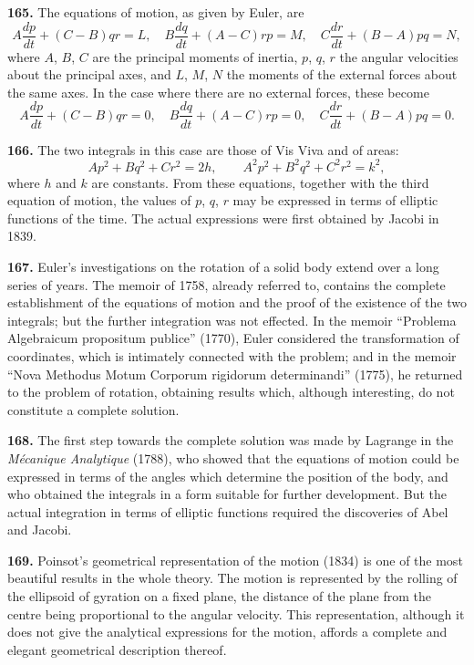 \documentclass[11pt,a4paper]{book}
\begin{document}
\textbf{165.} The equations of motion, as given by Euler, are
\[
A\frac{dp}{dt} + (C - B)qr = L, \quad B\frac{dq}{dt} + (A - C)rp = M, \quad C\frac{dr}{dt} + (B - A)pq = N,
\]
where $A$, $B$, $C$ are the principal moments of inertia, $p$, $q$, $r$ the angular velocities about the principal axes, and $L$, $M$, $N$ the moments of the external forces about the same axes. In the case where there are no external forces, these become
\[
A\frac{dp}{dt} + (C - B)qr = 0, \quad B\frac{dq}{dt} + (A - C)rp = 0, \quad C\frac{dr}{dt} + (B - A)pq = 0.
\]

\textbf{166.} The two integrals in this case are those of Vis Viva and of areas:
\[
Ap^2 + Bq^2 + Cr^2 = 2h, \qquad A^2p^2 + B^2q^2 + C^2r^2 = k^2,
\]
where $h$ and $k$ are constants. From these equations, together with the third equation of motion, the values of $p$, $q$, $r$ may be expressed in terms of elliptic functions of the time. The actual expressions were first obtained by Jacobi in 1839.

\textbf{167.} Euler's investigations on the rotation of a solid body extend over a long series of years. The memoir of 1758, already referred to, contains the complete establishment of the equations of motion and the proof of the existence of the two integrals; but the further integration was not effected. In the memoir ``Problema Algebraicum propositum publice'' (1770), Euler considered the transformation of coordinates, which is intimately connected with the problem; and in the memoir ``Nova Methodus Motum Corporum rigidorum determinandi'' (1775), he returned to the problem of rotation, obtaining results which, although interesting, do not constitute a complete solution.

\textbf{168.} The first step towards the complete solution was made by Lagrange in the \textit{M\'ecanique Analytique} (1788), who showed that the equations of motion could be expressed in terms of the angles which determine the position of the body, and who obtained the integrals in a form suitable for further development. But the actual integration in terms of elliptic functions required the discoveries of Abel and Jacobi.

\textbf{169.} Poinsot's geometrical representation of the motion (1834) is one of the most beautiful results in the whole theory. The motion is represented by the rolling of the ellipsoid of gyration on a fixed plane, the distance of the plane from the centre being proportional to the angular velocity. This representation, although it does not give the analytical expressions for the motion, affords a complete and elegant geometrical description thereof.
\end{document}
